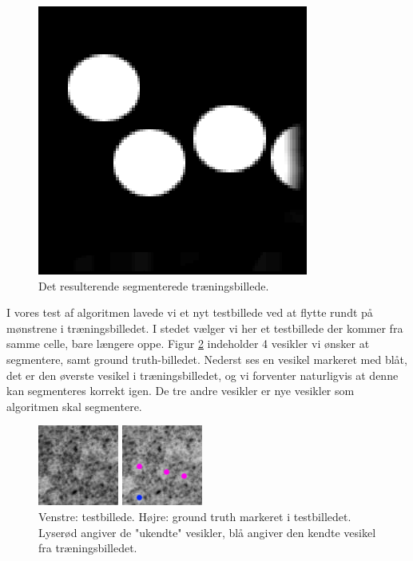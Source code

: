 \begin{figure}[H]
		\centering
		\includegraphics[scale=0.54]{files/postmethod/img/sld_preres2.png}
	\caption{Det resulterende segmenterede træningsbillede.\label{fig:postmethod_sld_label2}}
\end{figure}

I vores test af algoritmen lavede vi et nyt testbillede ved at flytte rundt på mønstrene i træningsbilledet. I stedet vælger vi her et testbillede der kommer fra samme celle, bare længere oppe. Figur \ref{fig:postmethod_sld_res2} indeholder 4 vesikler vi ønsker at segmentere, samt ground truth-billedet. Nederst ses en vesikel markeret med blåt, det er den øverste vesikel i træningsbilledet, og vi forventer naturligvis at denne kan segmenteres korrekt igen. De tre andre vesikler er nye vesikler som algoritmen skal segmentere.

\begin{figure}[H]
	\begin{minipage}[b]{0.5\linewidth}
		\centering
		\includegraphics[scale=3]{files/postmethod/img/imTest2.png}
	\end{minipage}
	\hspace{0.8cm}
	\begin{minipage}[b]{0.5\linewidth}
		\centering
		\includegraphics[scale=3]{files/postmethod/img/sld_gt3.png}
	\end{minipage}
	\caption{Venstre: testbillede. Højre: ground truth markeret i testbilledet. Lyserød angiver de "ukendte" vesikler, blå angiver den kendte vesikel fra træningsbilledet.\label{fig:postmethod_sld_res2}}
\end{figure}

